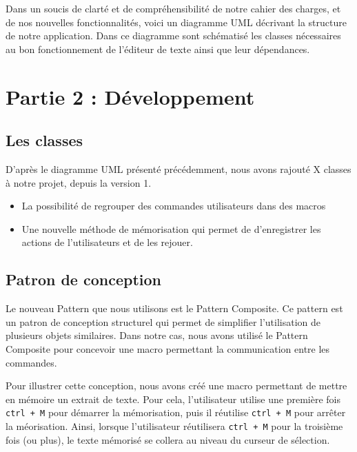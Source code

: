 \documentclass[a4paper, 12pt]{report}
\begin{document}
		Dans un soucis de clarté et de compréhensibilité de notre cahier des charges, et de nos nouvelles fonctionnalités, voici un diagramme UML décrivant la structure de notre application. Dans ce diagramme sont schématisé les classes nécessaires au bon fonctionnement de l’éditeur de texte ainsi que leur dépendances.
		
	\newpage
	
	\chapter*{Partie 2 : Développement}

		\section*{Les classes}

			D'après le diagramme UML présenté précédemment, nous avons rajouté X classes à notre projet, depuis la version 1.

		\begin{itemize}
			\item La possibilité de regrouper des commandes utilisateurs dans des macros

			\item Une nouvelle méthode de mémorisation qui permet de d'enregistrer les actions de l'utilisateurs et de les rejouer. 

		\end{itemize}

		\section*{Patron de conception}

		Le nouveau Pattern que nous utilisons est le Pattern Composite. Ce pattern est un patron de conception structurel qui permet de simplifier l'utilisation de plusieurs objets similaires. Dans notre cas, nous avons utilisé le Pattern Composite pour concevoir une macro permettant la communication entre les commandes. 

		\vspace{0.5cm}

		Pour illustrer cette conception, nous avons créé une macro permettant de mettre en mémoire un extrait de texte. Pour cela, l'utilisateur utilise une première fois \texttt{ctrl + M} pour démarrer la mémorisation, puis il réutilise \texttt{ctrl + M} pour arrêter la méorisation. Ainsi, lorsque l'utilisateur réutilisera \texttt{ctrl + M} pour la troisième fois (ou plus), le texte mémorisé se collera au niveau du curseur de sélection. 
\end{document}
